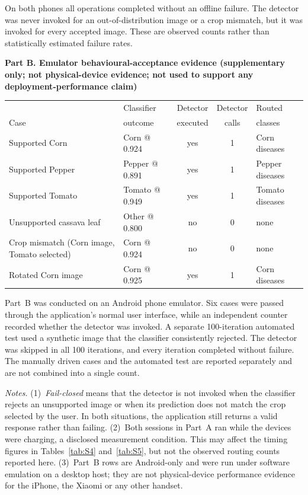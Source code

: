 {\footnotesize
On both phones all operations completed without an offline failure. The
detector was never invoked for an out-of-distribution image or a crop
mismatch, but it was invoked for every accepted image. These are observed
counts rather than statistically estimated failure rates.
\par}

\medskip
{}\noindent\textbf{Part B. Emulator behavioural-acceptance evidence
(supplementary only; not physical-device evidence; not used to support any
deployment-performance claim)}

\begin{center}\footnotesize\setlength{\tabcolsep}{5pt}
\begin{tabular}{p{110pt} l c c l}
\toprule
     & Classifier      & Detector & Detector & Routed \\
Case & outcome         & executed & calls    & classes \\
\midrule
Supported Corn   & Corn @ 0.924    & yes & 1 & Corn diseases   \\
Supported Pepper & Pepper @ 0.891  & yes & 1 & Pepper diseases \\
Supported Tomato & Tomato @ 0.949  & yes & 1 & Tomato diseases \\
Unsupported cassava leaf & Other @ 0.800 & no  & 0 & none        \\
Crop mismatch (Corn image, Tomato selected) & Corn @ 0.924 & no & 0 & none \\
Rotated Corn image & Corn @ 0.925 & yes & 1 & Corn diseases   \\
\bottomrule
\end{tabular}\end{center}

{\footnotesize
Part~B was conducted on an Android phone emulator. Six cases were passed
through the application's normal user interface, while an independent counter
recorded whether the detector was invoked. A separate 100-iteration automated
test used a synthetic image that the classifier consistently rejected. The
detector was skipped in all 100 iterations, and every iteration completed
without failure. The manually driven cases and the automated test are
reported separately and are not combined into a single count.

\textit{Notes.} (1)~\emph{Fail-closed} means that the detector is not invoked
when the classifier rejects an unsupported image or when its prediction does
not match the crop selected by the user. In both situations, the application
still returns a valid response rather than failing. (2)~Both sessions in Part~A ran while the devices were charging, a disclosed
measurement condition. This may affect the timing figures in
Tables~\ref{tab:S4} and~\ref{tab:S5}, but not the observed routing counts
reported here. (3)~Part~B rows are
Android-only and were run under software emulation on a desktop host; they
are not physical-device performance evidence for the iPhone, the Xiaomi or any
other handset.
\par}
\tabletail
